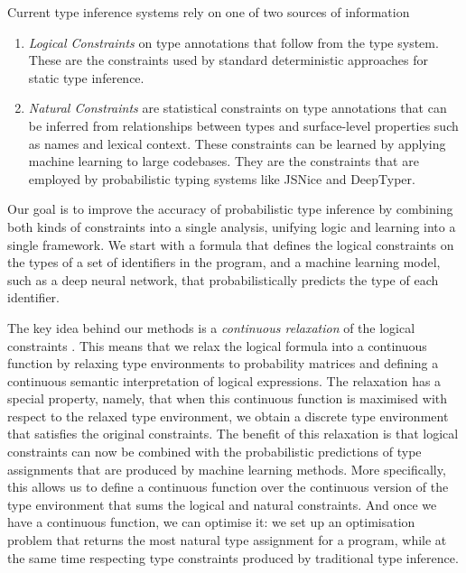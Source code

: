 \documentclass[acmsmall, review, anonymous]{acmart}\settopmatter{printfolios=true,printccs=false,printacmref=false}
\begin{document}
Current type inference systems rely
on one of two sources of information
\begin{enumerate}[label=(\Roman*)]
	\item \emph{Logical Constraints} on type annotations that follow from the type system.
	      These are the constraints used by standard deterministic approaches for static type inference.
	\item \emph{Natural Constraints} are statistical constraints on type annotations
	      that can be inferred from relationships between types and surface-level properties such as names and lexical context.
	      These constraints can be learned by applying machine learning to large codebases.
	      They are the constraints that are employed by probabilistic typing systems like JSNice and DeepTyper.
\end{enumerate}
Our goal is to improve the accuracy of probabilistic type
inference by combining both kinds of constraints into a single analysis, unifying logic and learning into a single framework.
We start with a formula that defines the logical constraints on the types of a set of identifiers in the program,
and a machine learning model, such as a deep neural network, that probabilistically predicts the type of each identifier.

The key idea behind our methods is a
\emph{continuous relaxation} of
the logical constraints \cite{hajek98}.
This means that  we relax the logical formula into a continuous function by relaxing type environments
to probability matrices and defining
a continuous semantic interpretation of logical expressions.
The relaxation has a special property, namely,
that when this continuous function is maximised with respect
to the relaxed type environment, we obtain a discrete type environment
that satisfies the original constraints.
The benefit of this relaxation is that logical constraints
can now be combined with the probabilistic
predictions of type assignments that are
produced by machine learning methods.
More specifically, this allows us to define a continuous function over the continuous version of the type environment
that sums the logical and natural constraints.
And once we have a continuous function, we can optimise it:
we set up an optimisation problem that returns the most natural type assignment for a
program, while at the same time respecting type constraints produced by traditional type inference.
\end{document}

